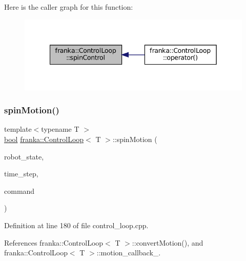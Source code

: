 Here is the caller graph for this function\+:
\nopagebreak
\begin{figure}[H]
\begin{center}
\leavevmode
\includegraphics[width=342pt]{classfranka_1_1ControlLoop_a480c19a57bf2a7df4ab9c6f68667b865_icgraph}
\end{center}
\end{figure}
\mbox{\label{classfranka_1_1ControlLoop_abec82e0ac5015ccc5fb078851ecae381}} 
\subsubsection{\texorpdfstring{spin\+Motion()}{spinMotion()}}
{\footnotesize\ttfamily template$<$typename T $>$ \\
\hyperlink{classbool}{bool} \hyperlink{classfranka_1_1ControlLoop}{franka\+::\+Control\+Loop}$<$ T $>$\+::spin\+Motion (\begin{DoxyParamCaption}\item[{const \hyperlink{structfranka_1_1RobotState}{Robot\+State} \&}]{robot\+\_\+state,  }\item[{\hyperlink{classfranka_1_1Duration}{franka\+::\+Duration}}]{time\+\_\+step,  }\item[{\hyperlink{structresearch__interface_1_1robot_1_1MotionGeneratorCommand}{research\+\_\+interface\+::robot\+::\+Motion\+Generator\+Command} $\ast$}]{command }\end{DoxyParamCaption})\hspace{0.3cm}{\ttfamily [protected]}}



Definition at line 180 of file control\+\_\+loop.\+cpp.



References franka\+::\+Control\+Loop$<$ T $>$\+::convert\+Motion(), and franka\+::\+Control\+Loop$<$ T $>$\+::motion\+\_\+callback\+\_\+.




